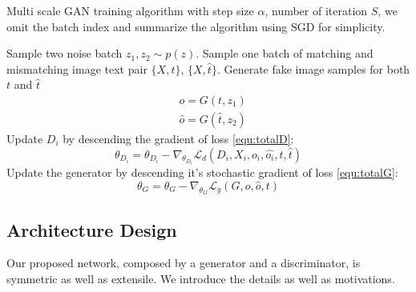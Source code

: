 \documentclass[10pt,twocolumn,letterpaper]{article}
\begin{document}
 \begin{algorithm}
 	\caption{Multi scale GAN training algorithm with step size $\alpha$, number of iteration $S$, we omit the batch index and summarize the algorithm using SGD for simplicity.}
 	\label{CHalgorithm}
 	\begin{algorithmic}[1]
 		\State Sample two noise batch $z_1, z_2 \sim p(z)$.
 		\State Sample one batch of matching and mismatching image text pair $\{X, t\}$,  $\{X, \hat{t}\}$.
 		\State Generate fake image samples for both $t$ and $\hat{t}$
 		\begin{equation}
 		\begin{split}
	 		& {o} = G(t, z_1) \\
	 		& {\hat{o}} = G(\hat{t}, z_2) 
 		\end{split}
 		\end{equation}
		 		\State Update $D_i$ by descending the gradient of loss \ref{equ:totalD}:
		 		\begin{equation}
		 		   	\theta_{D_i} = \theta_{D_i}  - \nabla_{\theta_{D_i}} \mathcal{L}_d(D_i, X_i,o_i,\hat{o_i}, t,\hat{t})
		 		\end{equation}
	 		\EndFor
 		\EndFor
 		\State Update the generator by descending it's stochastic gradient of loss \ref{equ:totalG}:
 		\begin{equation}
 		\theta_{G} = \theta_{G}  - \nabla_{\theta_{G}} \mathcal{L}_g(G, o, \hat{o}, t)
 		\end{equation}
 		
 		
 		\EndFor
 		
 	\end{algorithmic}
 \end{algorithm}
 

\subsection{Architecture Design}
Our proposed network, composed by a generator and a discriminator, is symmetric as well as extensile. We introduce the details as well as motivations.
\end{document}
